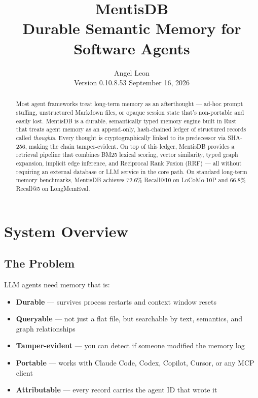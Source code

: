 \documentclass[11pt,a4paper]{article}
\title{\textbf{MentisDB}\\[0.3em]
\large Durable Semantic Memory for Software Agents}
\author{Angel Leon\\[0.3em]
\small Version 0.10.8.53 \quad \textemdash \quad September 16, 2026}
\date{}
\begin{document}
\maketitle

\begin{abstract}
Most agent frameworks treat long-term memory as an afterthought — ad-hoc prompt stuffing,
unstructured Markdown files, or opaque session state that's non-portable and easily lost.
MentisDB is a durable, semantically typed memory engine built in Rust that treats agent
memory as an append-only, hash-chained ledger of structured records called \emph{thoughts}.
Every thought is cryptographically linked to its predecessor via SHA-256, making the chain
tamper-evident. On top of this ledger, MentisDB provides a retrieval pipeline that combines
BM25 lexical scoring, vector similarity, typed graph expansion, implicit edge inference,
and Reciprocal Rank Fusion (RRF) — all without requiring an external database or LLM service
in the core path. On standard long-term memory benchmarks, MentisDB achieves 72.6\% Recall@10
on LoCoMo-10P and 66.8\% Recall@5 on LongMemEval.
\end{abstract}

\tableofcontents
\newpage

\section{System Overview}

\subsection{The Problem}

LLM agents need memory that is:
\begin{itemize}
  \item \textbf{Durable} — survives process restarts and context window resets
  \item \textbf{Queryable} — not just a flat file, but searchable by text, semantics, and graph relationships
  \item \textbf{Tamper-evident} — you can detect if someone modified the memory log
  \item \textbf{Portable} — works with Claude Code, Codex, Copilot, Cursor, or any MCP client
  \item \textbf{Attributable} — every record carries the agent ID that wrote it
\end{itemize}
\end{document}
